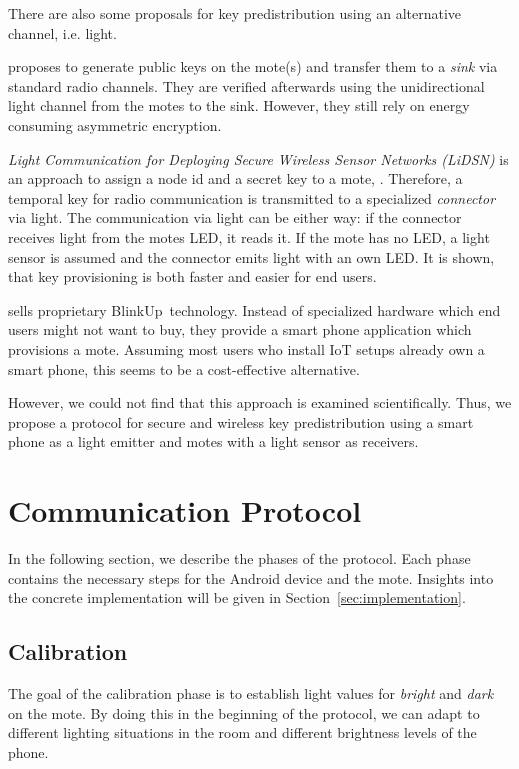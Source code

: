 \documentclass{sig-alternate} %
\begin{document}
There are also some proposals for key predistribution using an alternative channel, i.e. light.

\cite{saxena2009blink} proposes to generate public keys on the mote(s) and transfer them to a \textit{sink} via standard radio channels.
They are verified afterwards using the unidirectional light channel from the motes to the sink.
However, they still rely on energy consuming asymmetric encryption.

\textit{Light Communication for Deploying Secure Wireless Sensor Networks (LiDSN)} is an approach to assign a node id and a secret key to a mote, \cite{doan2012lidsn}.
Therefore, a temporal key for radio communication is transmitted to a specialized \textit{connector} via light.
The communication via light can be either way: if the connector receives light from the motes LED, it reads it. If the mote has no LED, a light sensor is assumed and the connector emits light with an own LED.
It is shown, that key provisioning is both faster and easier for end users.

\cite{electricimp} sells proprietary BlinkUp~\texttrademark  technology.
Instead of specialized hardware which end users might not want to buy, they provide a smart phone application which provisions a mote.
Assuming most users who install IoT setups already own a smart phone, this seems to be a cost-effective alternative.

However, we could not find that this approach is examined scientifically.
Thus, we propose a protocol for secure and wireless key predistribution using a smart phone as a light emitter and motes with a light sensor as receivers.

\section{Communication Protocol}
\label{sec:communication_protocol}

In the following section, we describe the phases of the protocol.
Each phase contains the necessary steps for the Android device and the mote.
Insights into the concrete implementation will be given in Section~\ref{sec:implementation}.

\subsection{Calibration}
\label{sub:calibration}

The goal of the calibration phase is to establish light values for \textit{bright} and \textit{dark} on the mote.
By doing this in the beginning of the protocol, we can adapt to different lighting situations in the room and different brightness levels of the phone.
\end{document}
